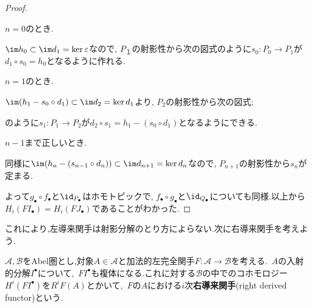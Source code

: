 \begin{proof}
\begin{step}
	\item $n=0$のとき.
	
	$\im h_0\subset\im d_1=\ker\varepsilon$なので, $P_１$の射影性から次の図式のように$s_0:P_0\to P_1$が$d_1\circ s_0=h_0$となるように作れる.
	
	\begin{figure}[H]
		\centering
		\caption{}
	\end{figure}

	\item $n=1$のとき.
	
	$\im (h_1-s_0\circ d_1)\subset\im d_2=\ker d_1$より, $P_2$の射影性から次の図式;
	
	\begin{figure}[H]
		\centering
		\caption{}
	\end{figure}
	
	のように$s_1:P_1\to P_2$が$d_2\circ s_1=h_1-(s_0\circ d_1)$となるようにできる.

	\item $n-1$まで正しいとき.
	
	同様に$\im (h_n-(s_{n-1}\circ d_n))\subset \im d_{n+1}=\ker d_n$なので, $P_{n+1}$の射影性から$s_n$が定まる.
\end{step}


よって$g_\bullet\circ f_\bullet$と$\id_{P_\bullet}$はホモトピックで, $f_\bullet\circ g_\bullet$と$\id_{Q_\bullet}$についても同様.以上から$H_i(FI_\bullet)=H_i(FJ_\bullet)$であることがわかった.
\end{proof}

これにより,左導来関手は射影分解のとり方によらない.次に右導来関手を考えよう.

\begin{defi}[右導来関手]
	$\mathscr{A,B}$をAbel圏とし,対象$A\in\mathscr{A}$と加法的左完全関手$F:\mathscr{A}\to\mathscr{B}$を考える.~$A$の入射的分解$I^\bullet$について,~$F I^\bullet$も複体になる.これに対する$\mathscr{B}$の中でのコホモロジー$H^i(F I^\bullet)$を$R^i F (A)$とかいて,~$F$の$A$における$i$次\textbf{右導来関手}(right derived functor)という.
\end{defi}

